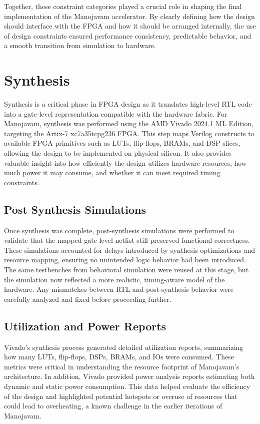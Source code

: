Together, these constraint categories played a crucial role in shaping the final implementation of the Manojavam accelerator. By clearly defining how the design should interface with the FPGA and how it should be arranged internally, the use of design constraints ensured performance consistency, predictable behavior, and a smooth transition from simulation to hardware.

\section{Synthesis}
Synthesis is a critical phase in FPGA design as it translates high-level RTL code into a gate-level representation compatible with the hardware fabric. For Manojavam, synthesis was performed using the AMD Vivado 2024.1 ML Edition, targeting the Artix-7 xc7a35tcpg236 FPGA. This step maps Verilog constructs to available FPGA primitives such as LUTs, flip-flops, BRAMs, and DSP slices, allowing the design to be implemented on physical silicon. It also provides valuable insight into how efficiently the design utilizes hardware resources, how much power it may consume, and whether it can meet required timing constraints.

\subsection{Post Synthesis Simulations}
Once synthesis was complete, post-synthesis simulations were performed to validate that the mapped gate-level netlist still preserved functional correctness. These simulations accounted for delays introduced by synthesis optimizations and resource mapping, ensuring no unintended logic behavior had been introduced. The same testbenches from behavioral simulation were reused at this stage, but the simulation now reflected a more realistic, timing-aware model of the hardware. Any mismatches between RTL and post-synthesis behavior were carefully analyzed and fixed before proceeding further.

\subsection{Utilization and Power Reports}
Vivado’s synthesis process generated detailed utilization reports, summarizing how many LUTs, flip-flops, DSPs, BRAMs, and IOs were consumed. These metrics were critical in understanding the resource footprint of Manojavam’s architecture. In addition, Vivado provided power analysis reports estimating both dynamic and static power consumption. This data helped evaluate the efficiency of the design and highlighted potential hotspots or overuse of resources that could lead to overheating, a known challenge in the earlier iterations of Manojavam.

